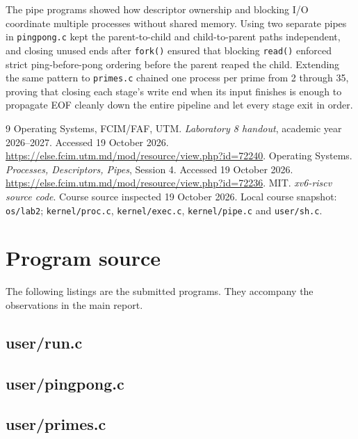 \documentclass{assets/utmreport}
\begin{document}
The pipe programs showed how descriptor ownership and blocking I/O coordinate multiple processes without shared memory. Using two separate pipes in \texttt{pingpong.c} kept the parent-to-child and child-to-parent paths independent, and closing unused ends after \texttt{fork()} ensured that blocking \texttt{read()} enforced strict ping-before-pong ordering before the parent reaped the child. Extending the same pattern to \texttt{primes.c} chained one process per prime from 2 through 35, proving that closing each stage's write end when its input finishes is enough to propagate EOF cleanly down the entire pipeline and let every stage exit in order.
\begin{thebibliography}{9}
 Operating Systems, FCIM/FAF, UTM. \textit{Laboratory 8 handout}, academic year 2026--2027. Accessed 19 October 2026. \url{https://else.fcim.utm.md/mod/resource/view.php?id=72240}.
 Operating Systems. \textit{Processes, Descriptors, Pipes}, Session 4. Accessed 19 October 2026. \url{https://else.fcim.utm.md/mod/resource/view.php?id=72236}.
 MIT. \textit{xv6-riscv source code}. Course source inspected 19 October 2026. Local course snapshot: \texttt{os/lab2}; \texttt{kernel/proc.c}, \texttt{kernel/exec.c}, \texttt{kernel/pipe.c} and \texttt{user/sh.c}.
\end{thebibliography}
\appendix
\chapter{Program source}
The following listings are the submitted programs. They accompany the observations in the main report.


\section{user/run.c}


\section{user/pingpong.c}


\section{user/primes.c}

\end{document}

